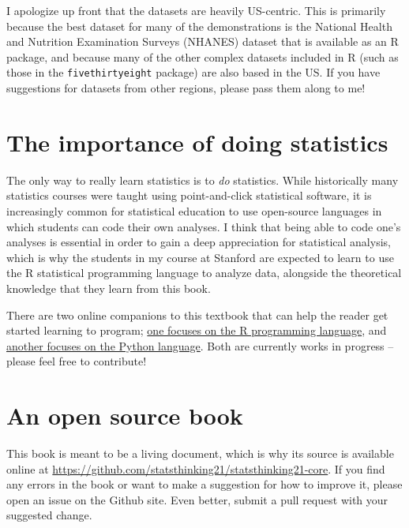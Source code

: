 \documentclass[
  12pt,
]{book}
\begin{document}
I apologize up front that the datasets are heavily US-centric. This is primarily because the best dataset for many of the demonstrations is the National Health and Nutrition Examination Surveys (NHANES) dataset that is available as an R package, and because many of the other complex datasets included in R (such as those in the \texttt{fivethirtyeight} package) are also based in the US. If you have suggestions for datasets from other regions, please pass them along to me!

\hypertarget{the-importance-of-doing-statistics}{%
\section{The importance of doing statistics}\label{the-importance-of-doing-statistics}}

The only way to really learn statistics is to \emph{do} statistics. While historically many statistics courses were taught using point-and-click statistical software, it is increasingly common for statistical education to use open-source languages in which students can code their own analyses. I think that being able to code one's analyses is essential in order to gain a deep appreciation for statistical analysis, which is why the students in my course at Stanford are expected to learn to use the R statistical programming language to analyze data, alongside the theoretical knowledge that they learn from this book.

There are two online companions to this textbook that can help the reader get started learning to program; \href{https://statsthinking21.github.io/statsthinking21-R-site/}{one focuses on the R programming language}, and \href{https://statsthinking21.github.io/statsthinking21-python/}{another focuses on the Python language}. Both are currently works in progress -- please feel free to contribute!

\hypertarget{an-open-source-book}{%
\section{An open source book}\label{an-open-source-book}}

This book is meant to be a living document, which is why its source is available online at \url{https://github.com/statsthinking21/statsthinking21-core}. If you find any errors in the book or want to make a suggestion for how to improve it, please open an issue on the Github site. Even better, submit a pull request with your suggested change.
\end{document}
